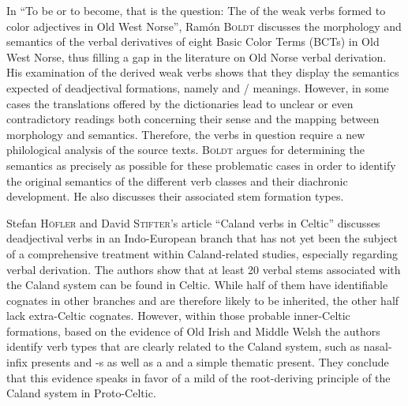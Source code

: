 \documentclass[output=paper,colorlinks,citecolor=brown]{langscibook}
\begin{document}
In {``To be or to become, that is the question: The  of the weak verbs formed to color adjectives in Old West Norse''}, Ramón \textsc{Boldt} discusses the morphology and semantics of the verbal derivatives of eight Basic Color Terms (BCTs)  in Old West Norse, thus filling a gap in the literature on Old Norse verbal derivation. His examination of the derived weak verbs shows that they  display the semantics expected of deadjectival formations, namely  and / meanings. However, in some cases the translations offered by the dictionaries lead to unclear or even contradictory readings both concerning their sense and the mapping between morphology and semantics. Therefore, the verbs in question require a new philological analysis of the source texts. \textsc{Boldt} argues for determining the semantics as precisely as possible for these problematic cases in order to identify the original semantics of the different verb classes and their diachronic development. He also discusses their associated stem formation types. 

Stefan \textsc{Höfler} and  David \textsc{Stifter}'s article ``Caland verbs in Celtic'' discusses deadjectival verbs in an Indo-European branch that has not yet been the subject of a comprehensive treatment within Caland-related studies,  especially regarding verbal derivation. The authors show that at least 20 verbal stems associated with the Caland system can be found in Celtic. While half of them have identifiable  cognates in other branches and are therefore likely to be inherited, the other half lack extra-Celtic cognates. However, within those probable inner-Celtic formations, based on the evidence of Old Irish and Middle Welsh the authors identify verb types that are clearly related to the Caland system,  such as nasal-infix presents  and -s as well as a  and a simple thematic present. They conclude that this evidence speaks in favor of a mild  of the root-deriving principle of the Caland system in Proto-Celtic.
\end{document}
